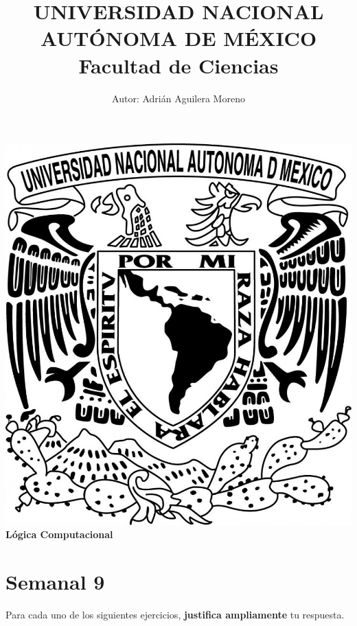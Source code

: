 \documentclass{article}
\begin{document}
\title{UNIVERSIDAD NACIONAL AUT\'ONOMA DE M\'EXICO\\ Facultad de Ciencias}
\author{Autor: Adri\'an Aguilera Moreno}
\date{}
\maketitle
\begin{center}
  \includegraphics[scale=0.20]{../Imagen/Portada.jpg}\\[0.4cm]
  \Large
  \bf{Lógica Computacional}
  \normalsize
\end{center}
\newpage
{}
\section*{\LARGE{Semanal 9}}
Para cada uno de los siguientes ejercicios, \textbf{justifica ampliamente} tu respuesta.
\end{document}
